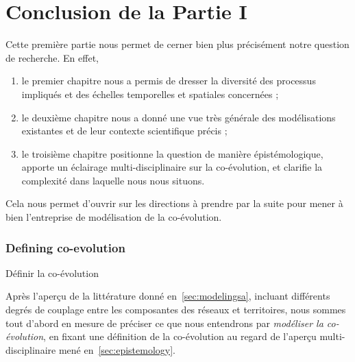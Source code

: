 






\chapter*{Conclusion de la Partie I}









Cette première partie nous permet de cerner bien plus précisément notre question de recherche. En effet,
\begin{enumerate}
	\item le premier chapitre nous a permis de dresser la diversité des processus impliqués et des échelles temporelles et spatiales concernées ;
	\item le deuxième chapitre nous a donné une vue très générale des modélisations existantes et de leur contexte scientifique précis ;
	\item le troisième chapitre positionne la question de manière épistémologique, apporte un éclairage multi-disciplinaire sur la co-évolution, et clarifie la complexité dans laquelle nous nous situons.
\end{enumerate}

Cela nous permet d'ouvrir sur les directions à prendre par la suite pour mener à bien l'entreprise de modélisation de la co-évolution.


\subsection*{Defining co-evolution}{Définir la co-évolution}

Après l'aperçu de la littérature donné en~\ref{sec:modelingsa}, incluant différents degrés de couplage entre les composantes des réseaux et territoires, nous sommes tout d'abord en mesure de préciser ce que nous entendrons par \emph{modéliser la co-évolution}, en fixant une définition de la co-évolution au regard de l'aperçu multi-disciplinaire mené en~\ref{sec:epistemology}.

